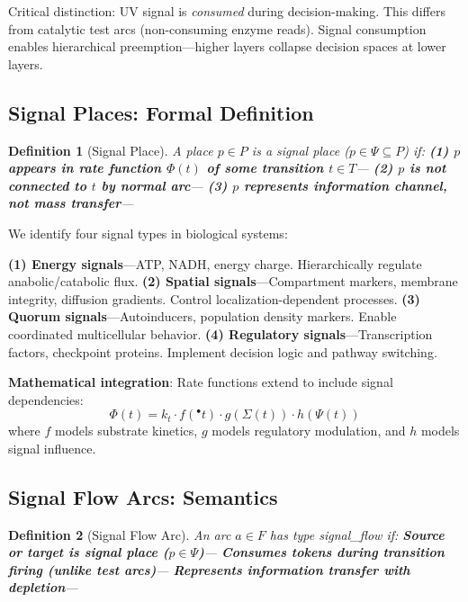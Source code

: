 \documentclass[twocolumn,11pt]{article}
\newtheorem{definition}{Definition}
\begin{document}
\vspace{3pt}
\noindent Critical distinction: UV signal is \textit{consumed} during decision-making. This differs from catalytic test arcs (non-consuming enzyme reads). Signal consumption enables hierarchical preemption---higher layers collapse decision spaces at lower layers.

\subsection{Signal Places: Formal Definition}

\begin{definition}[Signal Place]
A place $p \in P$ is a \textit{signal place} ($p \in \Psi \subseteq P$) if:
\textbf{(1) $p$ appears in rate function $\Phi(t)$ of some transition $t \in T$}--- \textbf{(2) $p$ is \textbf{not} connected to $t$ by normal arc}--- \textbf{(3) $p$ represents information channel, not mass transfer}---
\end{definition}

\vspace{3pt}
\noindent We identify four signal types in biological systems:

\vspace{3pt}
\noindent\textbf{(1) \textbf{Energy signals}}---ATP, NADH, energy charge. Hierarchically regulate anabolic/catabolic flux. \textbf{(2) \textbf{Spatial signals}}---Compartment markers, membrane integrity, diffusion gradients. Control localization-dependent processes. \textbf{(3) \textbf{Quorum signals}}---Autoinducers, population density markers. Enable coordinated multicellular behavior. \textbf{(4) \textbf{Regulatory signals}}---Transcription factors, checkpoint proteins. Implement decision logic and pathway switching.

\vspace{3pt}
\noindent\textbf{Mathematical integration}: Rate functions extend to include signal dependencies:
\[
\Phi(t) = k_t \cdot f({}^\bullet t) \cdot g(\Sigma(t)) \cdot h(\Psi(t))
\]
where $f$ models substrate kinetics, $g$ models regulatory modulation, and $h$ models signal influence.

\subsection{Signal Flow Arcs: Semantics}

\begin{definition}[Signal Flow Arc]
An arc $a \in F$ has type \textit{signal\_flow} if:
\textbf{Source or target is signal place ($p \in \Psi$)}--- \textbf{Consumes tokens during transition firing (unlike test arcs)}--- \textbf{Represents information transfer with depletion}---
\end{definition}
\end{document}
